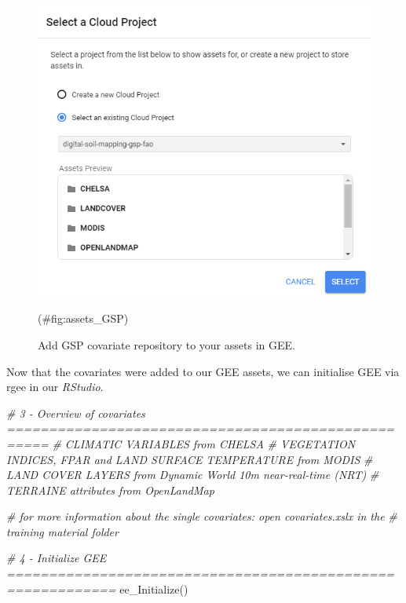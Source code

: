 \documentclass[
  10pt,
  b5paper,
  oneside]{book}
\newenvironment{Shaded}{\begin{snugshade}}{\end{snugshade}}
\newcommand{\CommentTok}[1]{\textcolor[rgb]{0.56,0.35,0.01}{\textit{#1}}}
\newcommand{\FunctionTok}[1]{\textcolor[rgb]{0.00,0.00,0.00}{#1}}
\newcommand{\NormalTok}[1]{#1}
\begin{document}
\begin{figure}
\includegraphics[width=8.25in]{images/6.1_GSP_Covariate_repository} \caption{Add GSP covariate repository to your assets in GEE.}(\#fig:assets_GSP)
\end{figure}

Now that the covariates were added to our GEE assets, we can initialise GEE via rgee in our \emph{RStudio}.

\begin{Shaded}
\begin{Highlighting}[]
\CommentTok{\# 3 {-} Overview of covariates ===================================================}
\CommentTok{\# CLIMATIC VARIABLES from CHELSA}
\CommentTok{\# VEGETATION INDICES, FPAR and LAND SURFACE TEMPERATURE from MODIS}
\CommentTok{\# LAND COVER LAYERS from Dynamic World 10m near{-}real{-}time (NRT) }
\CommentTok{\# TERRAINE attributes from OpenLandMap}

\CommentTok{\# for more information about the single covariates: open covariates.xslx in the }
\CommentTok{\# training material folder}

\CommentTok{\# 4 {-} Initialize GEE ===========================================================}
\FunctionTok{ee\_Initialize}\NormalTok{()}
\end{Highlighting}
\end{Shaded}
\end{document}
